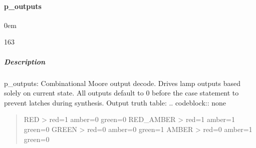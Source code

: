 \documentclass[letterpaper,10pt,english]{sphinxmanual}
\begin{document}
\sphinxstepscope


\paragraph{p\_outputs}
\label{\detokenize{modules/traffic_light/processes/p_outputs:p-outputs}}\label{\detokenize{modules/traffic_light/processes/p_outputs::doc}}
\begin{DUlineblock}{0em}
\item[]  
\item[]  163
\item[]  
\item[]  
\end{DUlineblock}


\subparagraph{Description}
\label{\detokenize{modules/traffic_light/processes/p_outputs:description}}
\sphinxAtStartPar
p\_outputs: Combinational Moore output decode.
Drives lamp outputs based solely on current state.
All outputs default to 0 before the case statement to
prevent latches during synthesis.
Output truth table:
.. code\sphinxhyphen{}block:: none
\begin{quote}

\sphinxAtStartPar
RED       \sphinxhyphen{}\textgreater{} red=1 amber=0 green=0
RED\_AMBER \sphinxhyphen{}\textgreater{} red=1 amber=1 green=0
GREEN     \sphinxhyphen{}\textgreater{} red=0 amber=0 green=1
AMBER     \sphinxhyphen{}\textgreater{} red=0 amber=1 green=0
\end{quote}

\noindent{}
\end{document}
